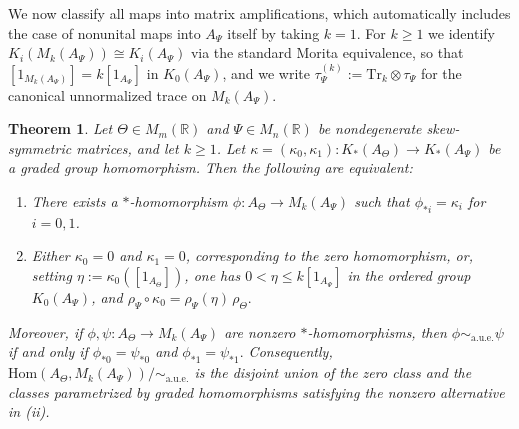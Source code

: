 \documentclass[11pt]{amsart}
\newtheorem{theorem}{Theorem}[section]
\theoremstyle{definition}
\theoremstyle{remark}
\newcommand{\R}{\mathbb{R}}
\newcommand{\aue}{\sim_{\mathrm{a.u.e.}}}
\newcommand{\Tr}{\mathrm{Tr}}
\begin{document}
We now classify all maps into matrix amplifications, which automatically includes the case of
nonunital maps into $A_{\Psi}$ itself by taking $k=1$. For $k\geq 1$ we identify $K_i(M_k(A_{\Psi}))\cong K_i(A_{\Psi})$
via the standard Morita equivalence, so that $[1_{M_k(A_\Psi)}]=k[1_{A_\Psi}]$
in $K_0(A_\Psi)$, and we write $\tau_{\Psi}^{(k)}:=\Tr_k\otimes\tau_\Psi$ for the canonical
unnormalized trace on $M_k(A_\Psi)$.

\begin{theorem}
\label{thm:nonunital-classification}
Let $\Theta\in M_m(\R)$ and $\Psi\in M_n(\R)$ be nondegenerate skew-symmetric matrices, and let $k\geq 1$.
Let $\kappa=(\kappa_0,\kappa_1)\colon K_*(A_\Theta)\to K_*(A_\Psi)$
be a graded group homomorphism. Then the following are equivalent:
\begin{enumerate}[label=\textup{(\roman*)}]
\item There exists a $*$-homomorphism $\phi\colon A_\Theta\to M_k(A_\Psi)$
such that $\phi_{*i}=\kappa_i$ for $i=0,1$.

\item Either $\kappa_0=0$ and $\kappa_1=0$, corresponding to the zero
homomorphism, or, setting $\eta:=\kappa_0([1_{A_\Theta}])$,
one has
$0<\eta\leq k[1_{A_\Psi}]$ in the ordered group $K_0(A_\Psi)$, and $\rho_\Psi\circ\kappa_0=\rho_\Psi(\eta)\,\rho_\Theta.$ 
\end{enumerate}

Moreover, if $\phi,\psi\colon A_\Theta\to M_k(A_\Psi)$ are nonzero $*$-homomorphisms, then $\phi\aue\psi$
if and only if $
\phi_{*0}=\psi_{*0}$ and
$\phi_{*1}=\psi_{*1}.$
Consequently, $\mathrm{Hom}(A_\Theta,M_k(A_\Psi))/\!\aue$
is the disjoint union of the zero class and the classes parametrized by graded
homomorphisms satisfying the nonzero alternative in \textup{(ii)}.
\end{theorem}
\end{document}
